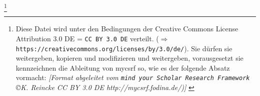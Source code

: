 %
%
%

\footnote{Diese Datei wird unter den Bedingungen der Creative Commons License
Attribution 3.0 DE = \texttt{CC BY 3.0 DE} verteilt. ($\Rightarrow$
\texttt{https://creativecommons.org/licenses/by/3.0/de/}). Sie dürfen sie
weitergeben, kopieren und modifizieren und weitergeben, vorausgesetzt sie
kennzeichnen die Ableitung von mycsrf so, wie es der folgende Absatz vormacht:
\newline  
{ \tiny \itshape [Format abgeleitet vom \texttt{mind your Scholar Research
Framework} \copyright K. Reincke CC BY 3.0 DE http://mycsrf.fodina.de/)] }}

